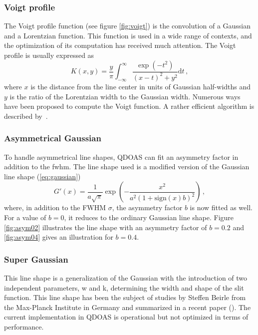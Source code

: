 \subsubsection{Voigt profile}
The Voigt profile function (see figure \ref{fig:voigt}) is the
convolution of a Gaussian and a Lorentzian function. This function is
used in a wide range of contexts, and the optimization of its
computation has received much attention. The Voigt profile is usually
expressed as
\begin{equation}
  \label{eq:voigt_profile}
  K(x,y) = \frac{y}{\pi} \int_{-\infty}^{\infty} \frac{\exp(-t^2)}{(x-t)^2+y^2}\mathrm{d}t\,,
\end{equation}
where $x$ is the distance from the line center in units of Gaussian
half-widths and $y$ is the ratio of the Lorentzian width to the
Gaussian width. Numerous ways have been proposed to compute the Voigt
function. A rather efficient algorithm is described
by~\citet{Kuntz_1997}. %

\subsubsection{Asymmetrical Gaussian}
To handle asymmetrical line shapes, QDOAS can fit an asymmetry factor
in addition to the \gls{fwhm}.  The line shape used is a modified version of
the Gaussian line shape (\ref{eq:gaussian})
\begin{equation}
  \label{eq:asymmetrical_line}
  G'(x) = \frac{1}{a\sqrt{\pi}}\exp\left(
    -\frac{x^2}{a^2(1+\mathrm{sign}(x)b)^2}\right)\,,
\end{equation}
where, in addition to the FWHM $\sigma$, the asymmetry factor $b$ is
now fitted as well.  For a value of $b=0$, it reduces to the ordinary
Gaussian line shape.  Figure \ref{fig:asym02} illustrates the line
shape with an asymmetry factor of $b=0.2$ and \ref{fig:asym04} gives
an illustration for $b=0.4$.

\subsubsection{Super Gaussian}
This line shape is a generalization of the Gaussian with the introduction of two independent parameters, w and k, determining
the width and shape of the slit function.  This line shape has been the subject of studies by Steffen Beirle from the Max-Planck Institute in Germany and summarized in a recent paper (\citep{Beirle2017}).
The current implementation in QDOAS is operational but not optimized in terms of performance.

